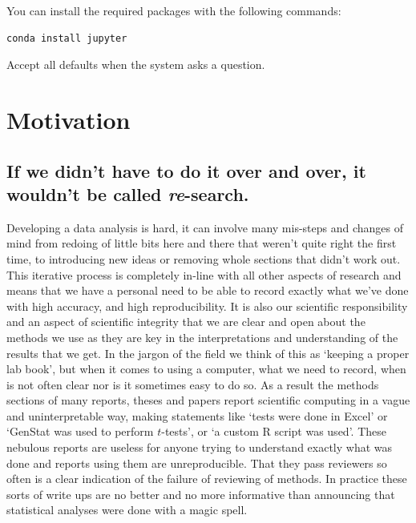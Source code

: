 \documentclass[
]{book}
\begin{document}
You can install the required packages with the following commands:

\begin{verbatim}
conda install jupyter
\end{verbatim}

Accept all defaults when the system asks a question.

\hypertarget{motivation}{%
\chapter{Motivation}\label{motivation}}

\hypertarget{if-we-didnt-have-to-do-it-over-and-over-it-wouldnt-be-called-re-search.}{%
\section{\texorpdfstring{If we didn't have to do it over and over, it wouldn't be called \emph{re}-search.}{If we didn't have to do it over and over, it wouldn't be called re-search.}}\label{if-we-didnt-have-to-do-it-over-and-over-it-wouldnt-be-called-re-search.}}

Developing a data analysis is hard, it can involve many mis-steps and changes of mind from redoing of little bits here and there that weren't quite right the first time, to introducing new ideas or removing whole sections that didn't work out. This iterative process is completely in-line with all other aspects of research and means that we have a personal need to be able to record exactly what we've done with high accuracy, and high reproducibility. It is also our scientific responsibility and an aspect of scientific integrity that we are clear and open about the methods we use as they are key in the interpretations and understanding of the results that we get. In the jargon of the field we think of this as `keeping a proper lab book', but when it comes to using a computer, what we need to record, when is not often clear nor is it sometimes easy to do so. As a result the methods sections of many reports, theses and papers report scientific computing in a vague and uninterpretable way, making statements like `tests were done in Excel' or `GenStat was used to perform \(t\)-tests', or `a custom R script was used'. These nebulous reports are useless for anyone trying to understand exactly what was done and reports using them are unreproducible. That they pass reviewers so often is a clear indication of the failure of reviewing of methods. In practice these sorts of write ups are no better and no more informative than announcing that statistical analyses were done with a magic spell.
\end{document}
